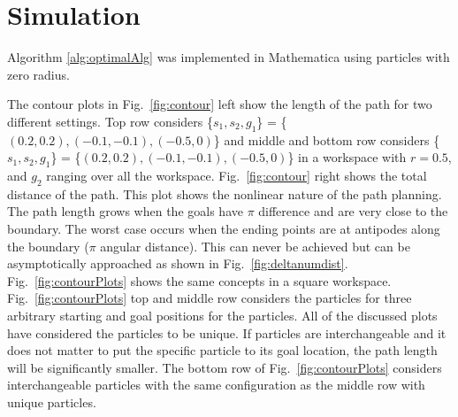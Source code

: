 
\section{Simulation}\label{sec:simulation}




Algorithm \ref{alg:optimalAlg}  was implemented in Mathematica using particles with zero radius. 
 
 The contour plots in Fig.~\ref{fig:contour} left show the length of the path for two different settings. Top row considers \{$s_1,s_2,g_1$\} = \{$(0.2,0.2),(-0.1,-0.1),(-0.5,0)$\} and middle and bottom row considers  \{$s_1,s_2,g_1$\} = \{$(0.2,0.2),(-0.1,-0.1),(-0.5,0)$\} in a workspace with $r= 0.5$, and $g_2$ ranging over all the workspace. Fig.~\ref{fig:contour} right shows the total distance of the path. This plot shows the nonlinear nature of the path planning. The path length grows when the goals have $\pi$ difference and are very close to the boundary. 
 The worst case occurs when the ending points are at antipodes along the boundary ($\pi$ angular distance). This can never be achieved but can be asymptotically approached as shown in Fig.~\ref{fig:deltanumdist}. 
 Fig.~\ref{fig:contourPlots} shows the same concepts in a square workspace. Fig.~\ref{fig:contourPlots} top and middle row considers the particles for three arbitrary starting and goal positions for the particles. All of the discussed plots have considered the particles to be unique. If particles are interchangeable and it does not matter to put the specific particle to its goal location, the path length will be significantly smaller. The bottom row of  Fig.~\ref{fig:contourPlots} considers interchangeable particles with the same configuration as the middle row with unique particles.
 
